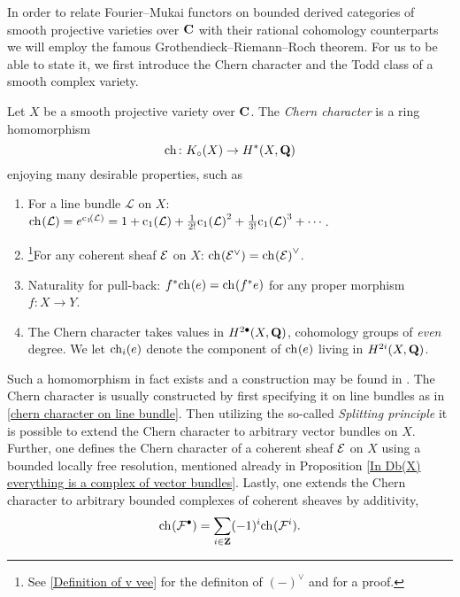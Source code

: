 In order to relate Fourier--Mukai functors on bounded derived categories of smooth projective varieties over $\mathbf C$ with their rational cohomology counterparts we will employ the famous Grothendieck--Riemann--Roch theorem. For us to be able to state it, we first introduce the Chern character and the Todd class of a smooth complex variety.

\begin{definition}
    \label{Definition of Chern character}
    Let $X$ be a smooth projective variety over $\mathbf C$. The \emph{Chern character} is a ring homomorphism
    \[
        \ch[] \colon \kgroup{X} \to \cohom{*}{X}{\Q}
    \] 
    enjoying many desirable properties, such as
    \begin{enumerate}[label = (\roman*)]
        \item{For a line bundle $\mathcal L$ on $X$: $\ch[](\mathcal L) = e^{\cclass[1]{\mathcal L}} = 1 + \cclass[1]{\mathcal L} + \frac{1}{2!}\cclass[1]{\mathcal L}^2 + \frac{1}{3!}\cclass[1]{\mathcal L}^3 + \cdots$.
        } \label{chern character on line bundle}
        \item{\footnote{
            See \ref{Definition of v vee} for the definiton of $(-)^\vee$ and \cite[Lemma C.7]{vanBree2020} for a proof.
        }For any coherent sheaf $\mathcal E$ on $X$: $\ch[]{\E^\vee} = \ch[]{\E}^\vee$.} \label{chern character and dual}
        \item{Naturality for pull-back: $f^*\ch[]{e} = \ch[]{f^*e}$ for any proper morphism $f \colon X \to Y$.}
        \item{The Chern character takes values in $H^{2\bullet}(X, \mathbf Q)$, \ie cohomology groups of \emph{even} degree. We let $\ch[i](e)$ denote the component of $\ch[]{e}$ living in $H^{2i}(X, \mathbf Q)$.}
    \end{enumerate} 
\end{definition}

\begin{remark}
    Such a homomorphism in fact exists and a construction may be found in \cite[\S 3.2]{Fulton1998}. The Chern character is usually constructed by first specifying it on line bundles as in \ref{chern character on line bundle}. Then utilizing the so-called \emph{Splitting principle} \cite[\S 3.2, Remark 3.2.3]{Fulton1998} it is possible to extend the Chern character to arbitrary vector bundles on $X$. Further, one defines the Chern character of a coherent sheaf $\mathcal E$ on $X$ using a bounded locally free resolution, mentioned already in Proposition \ref{In Db(X) everything is a complex of vector bundles}. Lastly, one extends the Chern character to arbitrary bounded complexes of coherent sheaves by additivity, \ie
    \[
        \ch[](\F^\bullet) = \sum_{i \in \Z}(-1)^i\ch[](\F^i).
    \] 
\end{remark}

